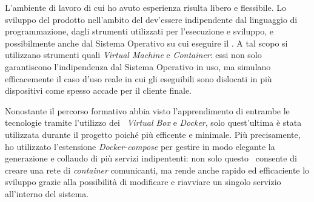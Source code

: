 L'ambiente di lavoro di cui ho avuto esperienza risulta libero e flessibile.
Lo sviluppo del prodotto nell'ambito del  dev'essere indipendente dal linguaggio di programmazione, dagli strumenti utilizzati per l'esecuzione e sviluppo, e possibilmente anche dal Sistema Operativo su cui eseguire il \software.
A tal scopo si utilizzano strumenti quali \textit{Virtual Machine} e \textit{Container}: essi non solo garantiscono l'indipendenza dal Sistema Operativo in uso, ma simulano efficacemente il caso d'uso reale in cui gli eseguibili sono dislocati in più dispositivi come spesso accade per il cliente finale.

Nonostante il percorso formativo abbia visto l'apprendimento di entrambe le tecnologie tramite l'utilizzo dei \software\ \textit{Virtual Box} e \textit{Docker}, solo quest'ultima è stata utilizzata durante il progetto poiché più efficente e minimale.
Più precisamente, ho utilizzato l'estensione \textit{Docker-compose} per gestire in modo elegante la generazione e collaudo di più servizi indipententi: non solo questo \software\ consente di creare una rete di \textit{container} comunicanti, ma rende anche rapido ed efficaciente lo sviluppo grazie alla possibilità di modificare e riavviare un singolo servizio all'interno del sistema.
